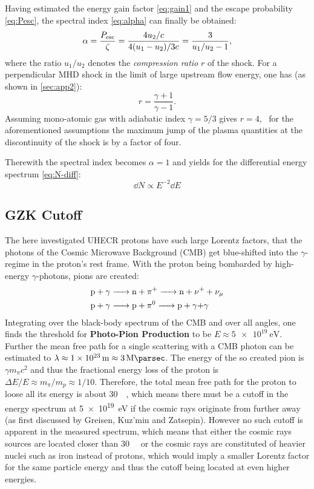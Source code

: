 Having estimated the energy gain factor \cref{eq:gain1} and the escape
probability \cref{eq:Pesc}, the spectral index \cref{eq:alpha} can finally be
obtained:
\begin{equation}
    \alpha=\frac{P_{\mathrm{esc}}}{\zeta}=\frac{4u_2/c}{4(u_1-u_2)/3c}=\frac{3}{u_1/u_2-1},
    \label{eq:alpha-plane-shock}
\end{equation}
where the ratio $u_1/u_2$ denotes the \emph{compression ratio} $r$ of the
shock. For a perpendicular MHD shock in the limit of large upstream flow
energy, one has (as shown in \cref{sec:app2}):
\begin{equation}
    r=\frac{\gamma+1}{\gamma-1}.
\end{equation}
Assuming mono-atomic gas with adiabatic index $\gamma=5/3$ gives $r=4$, \ie~for
the aforementioned assumptions the maximum jump of the plasma quantities at the
discontinuity of the shock is by a factor of four.

Therewith the spectral index becomes $\alpha=1$ and yields for the
differential energy spectrum \cref{eq:N-diff}:
\begin{equation}
    \boxed{\dd{N}\propto E^{-2}\dd{E}}
    \label{eq:N-power-2}
\end{equation}


\subsection{GZK Cutoff}
The here investigated UHECR protons have such large Lorentz factors, that the
photons of the Cosmic Microwave Background (CMB) get blue-shifted into the
$\gamma$-regime in the proton's rest frame.
With the proton being bombarded by high-energy $\gamma$-photons, pions are
created:
\begin{align*}
    \ce{p + $\gamma$ &-> n + $\pi^+$ -> n + $\nu^+ + \nu_{\mu}$} \\
    \ce{p + $\gamma$ &-> p + $\pi^0$ -> p + $\gamma + \gamma$}
\end{align*}
Integrating over the black-body spectrum of the CMB and over all angles, one
finds the threshold for \textbf{Photo-Pion Production} to be
$E\approx\SI{5e19}{\electronvolt}$. Further the mean free path for a single
scattering with a CMB photon can be estimated to
$\lambda\approx\SI{1e23}{\metre}\approx\SI{3}{\mega\parsec}$. The energy of the
so created pion is $\gamma m_{\pi} c^2$ and thus the fractional energy loss of
the proton is $\Delta{E}/E\approx m_{\pi}/m_p\approx 1/10$. Therefore, the
total mean free path for the proton to loose all its energy is about
\SI{30}{\mega\parsec}, which means there must be a cutoff in the energy
spectrum at \SI{5e19}{\electronvolt} if the cosmic rays originate from further
away (as first discussed by Greisen, Kuz'min and Zatsepin). However no such
cutoff is apparent in the measured spectrum, which means that either the cosmic
rays sources are located closer than \SI{30}{\mega\parsec} or the cosmic rays
are constituted of heavier nuclei such as iron instead of protons, which would imply
a smaller Lorentz factor for the same particle energy and thus the cutoff being
located at even higher energies.

